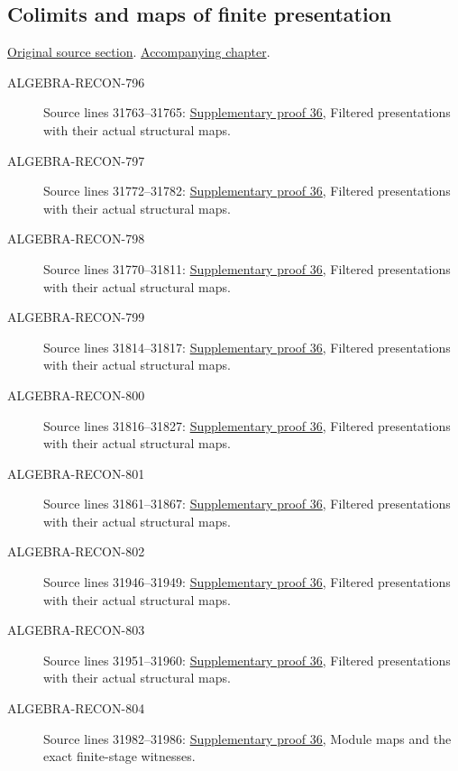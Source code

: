 \subsection{Colimits and maps of finite presentation}
\hypertarget{algebra-source-section-colimits-flat}{}
\noindent\href{https://github.com/stacks/stacks-project/blob/a04446e57ec1fbc252a871afcec7752fb2807b14/algebra.tex\#L31759}{Original source section}. \href{algebra.pdf\#nameddest=section-colimits-flat}{Accompanying chapter}.

\begin{description}
\item[ALGEBRA-RECON-796] Source lines 31763--31765: \hyperlink{algebra_colimit_categories_notes_20260928}{Supplementary proof 36}, Filtered presentations with their actual structural maps.
\item[ALGEBRA-RECON-797] Source lines 31772--31782: \hyperlink{algebra_colimit_categories_notes_20260928}{Supplementary proof 36}, Filtered presentations with their actual structural maps.
\item[ALGEBRA-RECON-798] Source lines 31770--31811: \hyperlink{algebra_colimit_categories_notes_20260928}{Supplementary proof 36}, Filtered presentations with their actual structural maps.
\item[ALGEBRA-RECON-799] Source lines 31814--31817: \hyperlink{algebra_colimit_categories_notes_20260928}{Supplementary proof 36}, Filtered presentations with their actual structural maps.
\item[ALGEBRA-RECON-800] Source lines 31816--31827: \hyperlink{algebra_colimit_categories_notes_20260928}{Supplementary proof 36}, Filtered presentations with their actual structural maps.
\item[ALGEBRA-RECON-801] Source lines 31861--31867: \hyperlink{algebra_colimit_categories_notes_20260928}{Supplementary proof 36}, Filtered presentations with their actual structural maps.
\item[ALGEBRA-RECON-802] Source lines 31946--31949: \hyperlink{algebra_colimit_categories_notes_20260928}{Supplementary proof 36}, Filtered presentations with their actual structural maps.
\item[ALGEBRA-RECON-803] Source lines 31951--31960: \hyperlink{algebra_colimit_categories_notes_20260928}{Supplementary proof 36}, Filtered presentations with their actual structural maps.
\item[ALGEBRA-RECON-804] Source lines 31982--31986: \hyperlink{algebra_colimit_categories_notes_20260928}{Supplementary proof 36}, Module maps and the exact finite-stage witnesses.

\end{description}
